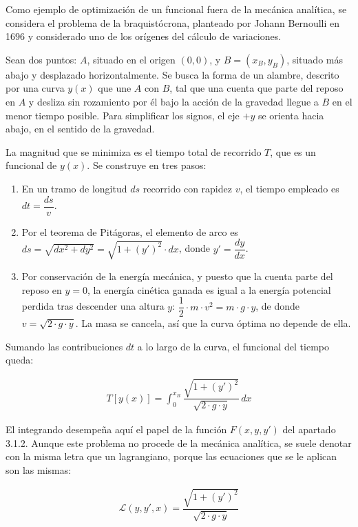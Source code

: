 \documentclass[
  spanish,
]{article}
\providecommand{\tightlist}{%
  \setlength{\itemsep}{0pt}\setlength{\parskip}{0pt}}
\begin{document}
Como ejemplo de optimización de un funcional fuera de la mecánica
analítica, se considera el problema de la braquistócrona, planteado por
Johann Bernoulli en 1696 y considerado uno de los orígenes del cálculo
de variaciones.

Sean dos puntos: \(A\), situado en el origen \((0,0)\), y
\(B = (x_B, y_B)\), situado más abajo y desplazado horizontalmente. Se
busca la forma de un alambre, descrito por una curva \(y(x)\) que une
\(A\) con \(B\), tal que una cuenta que parte del reposo en \(A\) y
desliza sin rozamiento por él bajo la acción de la gravedad llegue a
\(B\) en el menor tiempo posible. Para simplificar los signos, el eje
\(+y\) se orienta hacia abajo, en el sentido de la gravedad.

La magnitud que se minimiza es el tiempo total de recorrido \(T\), que
es un funcional de \(y(x)\). Se construye en tres pasos:

\begin{enumerate}
\def\labelenumi{\arabic{enumi}.}
\tightlist
\item
  En un tramo de longitud \(ds\) recorrido con rapidez \(v\), el tiempo
  empleado es \(dt = \dfrac{ds}{v}\).
\item
  Por el teorema de Pitágoras, el elemento de arco es
  \(ds = \sqrt{dx^2 + dy^2} = \sqrt{1 + (y')^2} \cdot dx\), donde
  \(y' = \dfrac{dy}{dx}\).
\item
  Por conservación de la energía mecánica, y puesto que la cuenta parte
  del reposo en \(y=0\), la energía cinética ganada es igual a la
  energía potencial perdida tras descender una altura \(y\):
  \(\dfrac{1}{2} \cdot m \cdot v^2 = m \cdot g \cdot y\), de donde
  \(v = \sqrt{2 \cdot g \cdot y}\). La masa se cancela, así que la curva
  óptima no depende de ella.
\end{enumerate}

Sumando las contribuciones \(dt\) a lo largo de la curva, el funcional
del tiempo queda:

\[
\begin{aligned}
T[y(x)] = \int_{0}^{x_B} \dfrac{\sqrt{1 + (y')^2}}{\sqrt{2 \cdot g \cdot y}} \, dx
\end{aligned}
\]

El integrando desempeña aquí el papel de la función \(F(x,y,y')\) del
apartado 3.1.2. Aunque este problema no procede de la mecánica
analítica, se suele denotar con la misma letra que un lagrangiano,
porque las ecuaciones que se le aplican son las mismas:

\[
\begin{aligned}
\mathcal{L}(y, y', x) = \dfrac{\sqrt{1 + (y')^2}}{\sqrt{2 \cdot g \cdot y}}
\end{aligned}
\]
\end{document}
